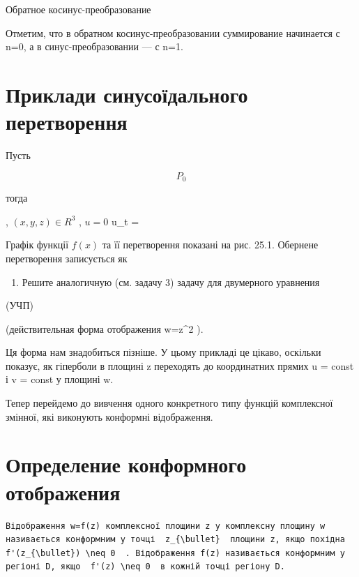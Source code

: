 \documentclass[
  ukrainian,
]{article}
\providecommand{\tightlist}{%
  \setlength{\itemsep}{0pt}\setlength{\parskip}{0pt}}
\begin{document}
Обратное косинус-преобразование

Отметим, что в обратном косинус-преобразовании суммирование начинается с
n=0, а в синус-преобразовании --- с n=1.

\section{Приклади синусоїдального
перетворення}\label{ux43fux440ux438ux43aux43bux430ux434ux438-ux441ux438ux43dux443ux441ux43eux457ux434ux430ux43bux44cux43dux43eux433ux43e-ux43fux435ux440ux435ux442ux432ux43eux440ux435ux43dux43dux44f}

Пусть

\[
P_{0}
\]

тогда

, \((x, y, z) \in R^3\) , \(u = 0\) u\_t =

Графік функції \(f(x)\) та її перетворення показані на рис. 25.1.
Обернене перетворення записується як

\begin{enumerate}
\def\labelenumi{\arabic{enumi}.}
\setcounter{enumi}{3}
\tightlist
\item
  Решите аналогичную (см. задачу 3) задачу для двумерного уравнения
\end{enumerate}

(УЧП)

(действительная форма отображения w=z\^{}2 ).

Ця форма нам знадобиться пізніше. У цьому прикладі це цікаво, оскільки
показує, як гіперболи в площині z переходять до координатних прямих u =
const і v = const у площині w.

Тепер перейдемо до вивчення одного конкретного типу функцій комплексної
змінної, які виконують конформні відображення.

\section{Определение конформного
отображения}\label{ux43eux43fux440ux435ux434ux435ux43bux435ux43dux438ux435-ux43aux43eux43dux444ux43eux440ux43cux43dux43eux433ux43e-ux43eux442ux43eux431ux440ux430ux436ux435ux43dux438ux44f}

\begin{verbatim}
Відображення w=f(z) комплексної площини z у комплексну площину w називається конформним у точці  z_{\bullet}  площини z, якщо похідна  f'(z_{\bullet}) \neq 0  . Відображення f(z) називається конформним у регіоні D, якщо  f'(z) \neq 0  в кожній точці регіону D.
\end{verbatim}
\end{document}
